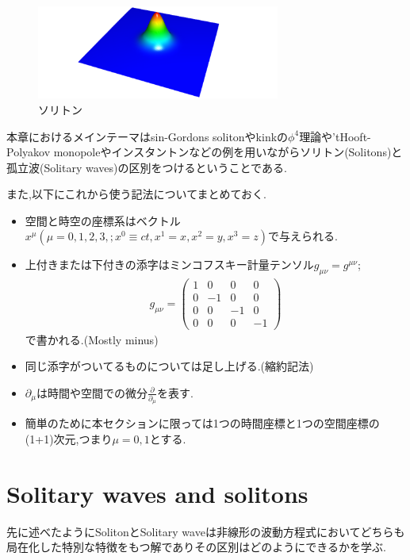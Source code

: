 \documentclass[dvipdfmx,11pt,a4paper]{jsbook}
\begin{document}
\begin{figure}[H]
    \centering
    \includegraphics[width=8cm]{figure/soliton.png}
    \caption{ソリトン}
    \label{soliton}
\end{figure}
本章におけるメインテーマはsin-Gordons solitonやkinkの$\phi^4$理論や'tHooft-Polyakov monopoleやインスタントンなどの例を用いながらソリトン(Solitons)と孤立波(Solitary waves)の区別をつけるということである.

また,以下にこれから使う記法についてまとめておく.
\begin{screen}
    \begin{itemize}
        \item 空間と時空の座標系はベクトル$x^{\mu}(\mu=0, 1, 2, 3, ; x^{0}\equiv ct, x^{1}=x, x^{2}=y, x^{3}=z)$で与えられる.
        \item 上付きまたは下付きの添字はミンコフスキー計量テンソル$g_{\mu \nu}=g^{\mu \nu}$;
              \begin{align*}
                  g_{\mu \nu}=
                  \left(\begin{array}{cccc}
                          1 & 0  & 0  & 0  \\
                          0 & -1 & 0  & 0  \\
                          0 & 0  & -1 & 0  \\
                          0 & 0  & 0  & -1
                      \end{array}\right)
              \end{align*}
              で書かれる.(Mostly minus)
        \item 同じ添字がついてるものについては足し上げる.(縮約記法)
        \item $\partial_{\mu}$は時間や空間での微分$\frac{\partial}{\partial_{\mu}}$を表す.
        \item 簡単のために本セクションに限っては1つの時間座標と1つの空間座標の(1+1)次元,つまり$\mu=0,1$とする.
    \end{itemize}
\end{screen}

\section{Solitary waves and solitons}
先に述べたようにSolitonとSolitary waveは非線形の波動方程式においてどちらも局在化した特別な特徴をもつ解でありその区別はどのようにできるかを学ぶ.
\end{document}
